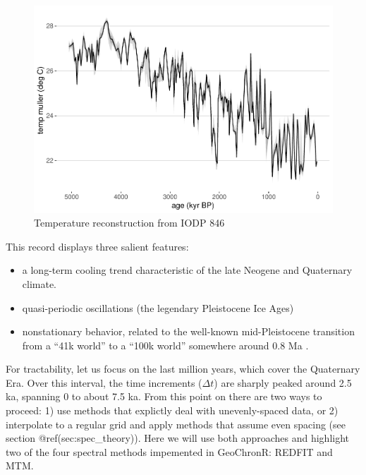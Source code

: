 \documentclass[gchron, manuscript]{copernicus}
\begin{document}
\begin{figure}
\includegraphics[width=12cm]{geoChronR-paper_files/figure-latex/odp846-timeseries-1} \caption{Temperature reconstruction from IODP 846}\label{fig:odp846-timeseries}
\end{figure}

This record displays three salient features:

\begin{itemize}
\item
  a long-term cooling trend characteristic of the late Neogene and Quaternary climate.
\item
  quasi-periodic oscillations (the legendary Pleistocene Ice Ages)
\item
  nonstationary behavior, related to the well-known mid-Pleistocene transition from a ``41k world'' to a ``100k world'' somewhere around 0.8 Ma \citep{Paillard_2001, lisiecki2005, ahn2017}.
\end{itemize}

For tractability, let us focus on the last million years, which cover the Quaternary Era.
Over this interval, the time increments (\(\Delta t\)) are sharply peaked around 2.5 ka, spanning 0 to about 7.5 ka.
From this point on there are two ways to proceed: 1) use methods that explictly deal with unevenly-spaced data, or 2) interpolate to a regular grid and apply methods that assume even spacing (see section @ref(sec:spec\_theory)). Here we will use both approaches and highlight two of the four spectral methods impemented in GeoChronR: REDFIT and MTM.
\end{document}
